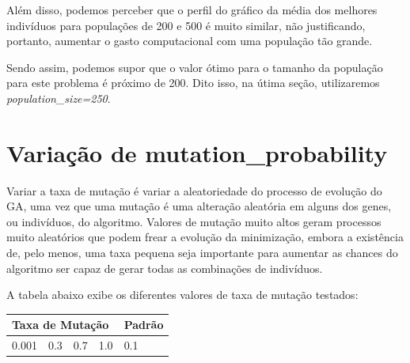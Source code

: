 \documentclass[12pt]{article}
\begin{document}
	Além disso, podemos perceber que o perfil do gráfico da média dos melhores indivíduos para populações de 200 e 500 é muito similar, não justificando, portanto, aumentar o gasto computacional com uma população tão grande.
	
	Sendo assim, podemos supor que o valor ótimo para o tamanho da população para este problema é próximo de 200. Dito isso, na útima seção, utilizaremos \textit{population\_size=250}.
	
	\section{Variação de mutation\_probability}
	
	Variar a taxa de mutação é variar a aleatoriedade do processo de evolução do GA, uma vez que uma mutação é uma alteração aleatória em alguns dos genes, ou indivíduos, do algoritmo. Valores de mutação muito altos geram processos muito aleatórios que podem frear a evolução da minimização, embora a existência de, pelo menos, uma taxa pequena seja importante para aumentar as chances do algoritmo ser capaz de gerar todas as combinações de indivíduos.
	
	A tabela abaixo exibe os diferentes valores de taxa de mutação testados:
	
	\begin{table}[H]
		\centering
		\begin{tabular}{|l|l|l|l|l|}
			\hline
			\multicolumn{4}{|l|}{Taxa de Mutação} & Padrão \\ \hline
			0.001    & 0.3    & 0.7    & 1.0    & 0.1    \\ \hline
		\end{tabular}
	\end{table}
	
\end{document}
